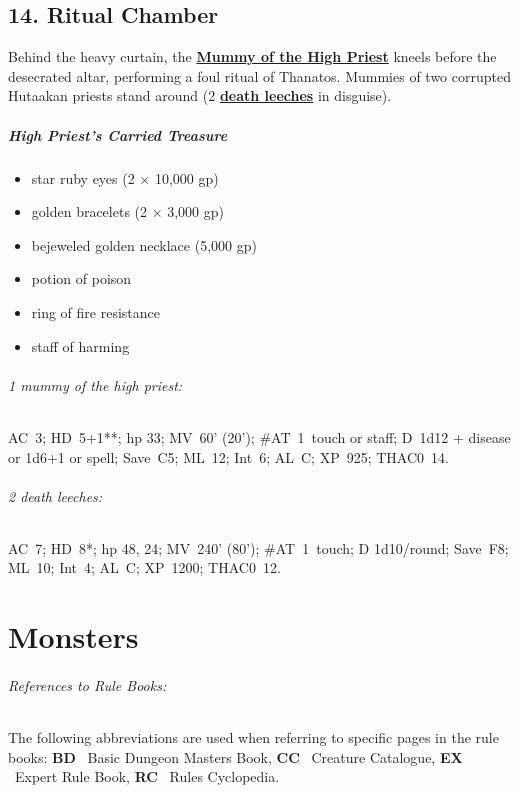 \documentclass[english,11pt,openany,letterpaper,twocolumn]{book}
\begin{document}
\hypertarget{room14}{}
\section{14. Ritual Chamber}

Behind the heavy curtain, the \hyperlink{mummy}{\textbf{Mummy of the High Priest}} kneels before the desecrated altar, performing a foul ritual of Thanatos. Mummies of two corrupted Hutaakan priests stand around (2 \hyperlink{leech}{\textbf{death leeches}} in disguise).

\skipline
\paragraph{High Priest's Carried Treasure}
\begin{itemize}[leftmargin=*]
\item star ruby eyes (2 × 10,000 gp)
\item golden bracelets (2 × 3,000 gp)
\item bejeweled golden necklace (5,000 gp)
\item potion of poison
\item ring of fire resistance
\item staff of harming
\end{itemize}


\begin{textbox}
	\subparagraph{1 mummy of the high priest:} AC~3; HD~5+1**; hp 33; MV~60' (20'); \#AT~1~touch or staff; D~1d12 + disease or 1d6+1 or spell; Save~C5; ML~12; Int~6; AL~C; XP~925; THAC0~14.
	
	\skipline
	\subparagraph{2 death leeches:} AC~7; HD~8*; hp 48, 24; MV~240' (80'); \#AT~1~touch; D 1d10/round; Save~F8; ML~10; Int~4; AL~C; XP~1200; THAC0~12.
\end{textbox}
\enlargethispage{\baselineskip}

\cleartorightpage
\onecolumn

\chapter{Monsters}

\subparagraph{References to Rule Books:}
The following abbreviations are used when referring to specific pages in the rule books:
\textbf{BD} \dash\ Basic Dungeon Masters Book,
\textbf{CC} \dash\ Creature Catalogue,
\textbf{EX} \dash\ Expert Rule Book,
\textbf{RC} \dash\ Rules Cyclopedia.

\newcommand{\setAnimalTabPositions}{%
	\setCustomTabPositions{%
		4,	4,	11,	16,	15,	6,	4,	5,	4,	5}%
}
\end{document}

